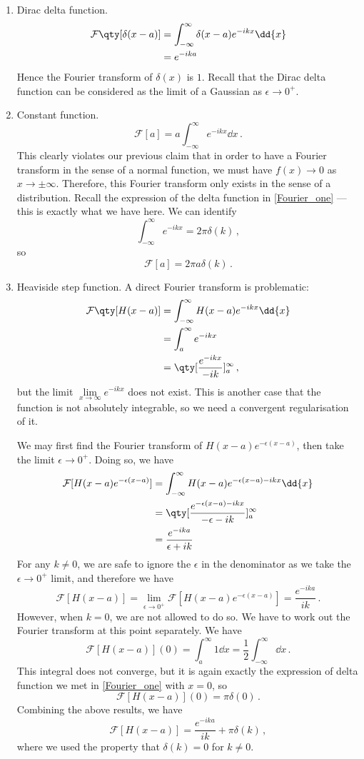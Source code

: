 \documentclass{article}
\theoremstyle{plain}\theoremheaderfont{\normalfont\itshape}\theorembodyfont{\rmfamily}\theoremseparator{.}\newtheorem*{rem}{Remark}\newtheorem*{ex}{Example}\newtheorem*{proof}{Proof}\newtheorem*{altp}{Alternative proof}
\theoremstyle{plain}\theoremheaderfont{\normalfont\bfseries}\theorembodyfont{\rmfamily}\theoremseparator{.}\newtheorem{thm}{Theorem}[section]\newtheorem{lem}[thm]{Lemma}\newtheorem{prop}[thm]{Proposition}\newtheorem*{cor}{Corollary}\newtheorem{defn}[thm]{Definition}\newtheorem{clm}[thm]{Claim}\newtheorem{clminproof}{Claim}
\theoremstyle{break}\theoremheaderfont{\normalfont\itshape}\theorembodyfont{\rmfamily}\theoremseparator{.\medskip}\newtheorem*{proofskip}{Proof}\newtheorem*{exs}{Examples}\newtheorem*{rems}{Remarks}
\theoremstyle{break}\theoremheaderfont{\normalfont\bfseries}\theorembodyfont{\rmfamily}\theoremseparator{.\medskip}\newtheorem{lemskip}[thm]{Lemma}\newtheorem{defnskip}[thm]{Definition}\newtheorem{propskip}[thm]{Proposition}\newtheorem{thmskip}[thm]{Theorem}
\numberwithin{equation}{section}
\begin{document}
\begin{enumerate}[topsep=0pt]
		\item Dirac delta function.
		\begin{align*}
			\mathcal{F}\qty[\delta(x-a)]&=\int_{-\infty}^{\infty}\delta(x-a)e^{-ikx}\dd{x}\\
			&=e^{-ika}			
		\end{align*}
		Hence the Fourier transform of \(\delta(x)\) is \(1\). Recall that the Dirac delta function can be considered as the limit of a Gaussian as \(\epsilon\to 0^+\).

		\item Constant function.
		\[\mathcal{F}[a]=a\int_{-\infty}^{\infty}e^{-ikx}\dd{x}\,.\]
		This clearly violates our previous claim that in order to have a Fourier transform in the sense of a normal function, we must have \(f(x)\to 0\) as \(x\to\pm\infty\). Therefore, this Fourier transform only exists in the sense of a distribution. Recall the expression of the delta function in \cref{Fourier_one} --- this is exactly what we have here. We can identify
		\[\int_{-\infty}^{\infty}e^{-ikx}=2\pi\delta(k)\,,\]
		so
		\[\mathcal{F}[a]=2\pi a\delta(k)\,.\]
		
		\item Heaviside step function. A direct Fourier transform is problematic:
		\begin{align*}
			\mathcal{F}\qty[H(x-a)]&=\int_{-\infty}^{\infty}H(x-a)e^{-ikx}\dd{x}\\
			&=\int_{a}^{\infty}e^{-ikx}\\
			&=\qty[\frac{e^{-ikx}}{-ik}]_{a}^{\infty}\,,
		\end{align*}
		but the limit \(\lim\limits_{x\to\infty}e^{-ikx}\) does not exist. This is another case that the function is not absolutely integrable, so we need a convergent regularisation of it.
		
		We may first find the Fourier transform of \(H(x-a)e^{-\epsilon(x-a)}\), then take the limit \(\epsilon\to 0^+\). Doing so, we have
		\begin{align*}
			\mathcal{F}[H(x-a)e^{-\epsilon(x-a)}]&=\int_{-\infty}^{\infty}H(x-a)e^{-\epsilon(x-a)-ikx}\dd{x}\\
			&=\qty[\frac{e^{-\epsilon(x-a)-ikx}}{-\epsilon-ik}]_a^\infty\\
			&=\frac{e^{-ika}}{\epsilon+ik}
		\end{align*}
		For any \(k\ne 0\), we are safe to ignore the \(\epsilon\) in the denominator as we take the \(\epsilon\to 0^+\) limit, and therefore we have
		\[\mathcal{F}[H(x-a)]=\lim_{\epsilon\to 0^+}\mathcal{F}[H(x-a)e^{-\epsilon(x-a)}]=\frac{e^{-ika}}{ik}\,.\]
		However, when \(k=0\), we are not allowed to do so. We have to work out the Fourier transform at this point separately. We have
		\[\mathcal{F}[H(x-a)](0)=\int_{a}^{\infty}1\dd{x}=\frac{1}{2}\int_{-\infty}^{\infty}\dd{x}\,.\]
		This integral does not converge, but it is again exactly the expression of delta function we met in \cref{Fourier_one} with \(x=0\), so
		\[\mathcal{F}[H(x-a)](0)=\pi\delta(0)\,.\]
		Combining the above results, we have
		\[\mathcal{F}[H(x-a)]=\frac{e^{-ika}}{ik}+\pi\delta(k)\,,\]
		where we used the property that \(\delta(k)=0\) for \(k\ne 0\).


\end{enumerate}
\end{document}

